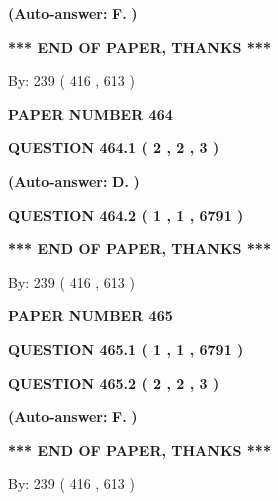 \documentclass[12pt]{article}
\begin{document}
 
{\textbf{(Auto-answer:}}
{\textbf{\large{
F.}}}
{\textbf{)}}
 
 
   
   
   
   
\vspace{1.0in} 
{\textbf{\large{ *** END OF PAPER, THANKS *** }}} 
   
   
\hspace{1.0in} By: 
 239 ( 416 ,  613 )
   
   
   
   
\newpage 
\setcounter{page}{ 
   464001 } 
   
   
 {\textbf{ \Large{ PAPER NUMBER  464  }}}
   
   
   
   
  
  
{\textbf{\large{QUESTION
464.1 
 ( 2 , 2 , 3 )
}}}
 
 
{\textbf{(Auto-answer:}}
{\textbf{\large{
D.}}}
{\textbf{)}}
 
 
  
  
{\textbf{\large{QUESTION
464.2 
 ( 1 , 1 , 6791 )
}}}
   
   
   
   
\vspace{1.0in} 
{\textbf{\large{ *** END OF PAPER, THANKS *** }}} 
   
   
\hspace{1.0in} By: 
 239 ( 416 ,  613 )
   
   
   
   
\newpage 
\setcounter{page}{ 
   465001 } 
   
   
 {\textbf{ \Large{ PAPER NUMBER  465  }}}
   
   
   
   
  
  
{\textbf{\large{QUESTION
465.1 
 ( 1 , 1 , 6791 )
}}}
  
  
{\textbf{\large{QUESTION
465.2 
 ( 2 , 2 , 3 )
}}}
 
 
{\textbf{(Auto-answer:}}
{\textbf{\large{
F.}}}
{\textbf{)}}
 
 
   
   
   
   
\vspace{1.0in} 
{\textbf{\large{ *** END OF PAPER, THANKS *** }}} 
   
   
\hspace{1.0in} By: 
 239 ( 416 ,  613 )
   
   
   
   
\newpage 
\setcounter{page}{ 
   466001 } 
   
\end{document}
